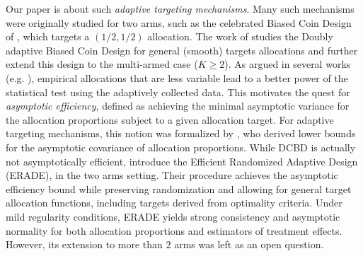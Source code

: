 \documentclass[11pt]{article}
\theoremstyle{plain}
\theoremstyle{definition}
\begin{document}
%
Our paper is about such \emph{adaptive targeting mechanisms}. Many such mechanisms were originally studied for two arms, such as the celebrated Biased Coin Design of \cite{Efron71BCD}, which targets a $(1/2,1/2)$ allocation. The work of \cite{hu2004asymptotic} studies the Doubly adaptive Biased Coin Design for general (smooth) targets allocations and further extend this design to the multi-armed case ($K \geq 2$). As argued in several works (e.g. \cite{HuRosenberger03VariabilityPower}), empirical allocations that are less variable lead to a better power of the statistical test using the adaptively collected data. This motivates the quest for \textit{asymptotic efficiency}, defined as achieving the minimal asymptotic variance for the allocation proportions subject to a given allocation target. For adaptive targeting mechanisms, this notion was formalized by \cite{hu2006asymptotically}, who derived lower bounds for the asymptotic covariance of allocation proportions. %
While DCBD is actually not asymptotically efficient, \cite{hu2009efficient} introduce the Efficient Randomized Adaptive Design (ERADE), in the two arms setting. Their procedure achieves the asymptotic efficiency bound while preserving randomization and allowing for general target allocation functions, including targets derived from optimality criteria. Under mild regularity conditions, ERADE yields strong consistency and asymptotic normality for both allocation proportions and estimators of treatment effects. However, its extension to more than $2$ arms was left as an open question.
\end{document}
